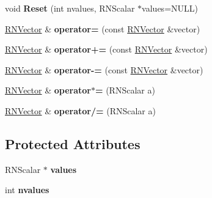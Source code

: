 \begin{DoxyCompactItemize}
\item 
void {\bfseries Reset} (int nvalues, R\+N\+Scalar $\ast$values=N\+U\+LL)\hypertarget{class_r_n_vector_a3d533a6ef9c711fbae6c7c653bed4ae4}{}\label{class_r_n_vector_a3d533a6ef9c711fbae6c7c653bed4ae4}

\item 
\hyperlink{class_r_n_vector}{R\+N\+Vector} \& {\bfseries operator=} (const \hyperlink{class_r_n_vector}{R\+N\+Vector} \&vector)\hypertarget{class_r_n_vector_a32257866280de6f50d805e243d83d478}{}\label{class_r_n_vector_a32257866280de6f50d805e243d83d478}

\item 
\hyperlink{class_r_n_vector}{R\+N\+Vector} \& {\bfseries operator+=} (const \hyperlink{class_r_n_vector}{R\+N\+Vector} \&vector)\hypertarget{class_r_n_vector_a59b7f9620dbad9b57376c1a93f3cab5b}{}\label{class_r_n_vector_a59b7f9620dbad9b57376c1a93f3cab5b}

\item 
\hyperlink{class_r_n_vector}{R\+N\+Vector} \& {\bfseries operator-\/=} (const \hyperlink{class_r_n_vector}{R\+N\+Vector} \&vector)\hypertarget{class_r_n_vector_a8bf36d948d04111fa6b1dd223b6936f9}{}\label{class_r_n_vector_a8bf36d948d04111fa6b1dd223b6936f9}

\item 
\hyperlink{class_r_n_vector}{R\+N\+Vector} \& {\bfseries operator$\ast$=} (R\+N\+Scalar a)\hypertarget{class_r_n_vector_ac0b2be745ecd1303d735e9782c334ac7}{}\label{class_r_n_vector_ac0b2be745ecd1303d735e9782c334ac7}

\item 
\hyperlink{class_r_n_vector}{R\+N\+Vector} \& {\bfseries operator/=} (R\+N\+Scalar a)\hypertarget{class_r_n_vector_adcb3bd86fc052ae403371317385e56a2}{}\label{class_r_n_vector_adcb3bd86fc052ae403371317385e56a2}

\end{DoxyCompactItemize}
\subsection*{Protected Attributes}
\begin{DoxyCompactItemize}
\item 
R\+N\+Scalar $\ast$ {\bfseries values}\hypertarget{class_r_n_vector_a1e0af0157e337733b856976ace521355}{}\label{class_r_n_vector_a1e0af0157e337733b856976ace521355}

\item 
int {\bfseries nvalues}\hypertarget{class_r_n_vector_af906f4dcdf0062284fa548b179adbdd1}{}\label{class_r_n_vector_af906f4dcdf0062284fa548b179adbdd1}

\end{DoxyCompactItemize}
